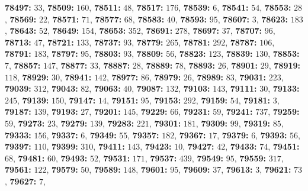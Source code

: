 \textsf{\bfseries 78497:} $33$, \textsf{\bfseries 78509:} $160$, \textsf{\bfseries 78511:} $48$, \textsf{\bfseries 78517:} $176$, \textsf{\bfseries 78539:} $6$, \textsf{\bfseries 78541:} $54$, \textsf{\bfseries 78553:} $28$, \textsf{\bfseries 78569:} $22$, \textsf{\bfseries 78571:} $71$, \textsf{\bfseries 78577:} $68$, \textsf{\bfseries 78583:} $40$, \textsf{\bfseries 78593:} $95$, \textsf{\bfseries 78607:} $3$, \textsf{\bfseries 78623:} $183$, \textsf{\bfseries 78643:} $52$, \textsf{\bfseries 78649:} $154$, \textsf{\bfseries 78653:} $352$, \textsf{\bfseries 78691:} $278$, \textsf{\bfseries 78697:} $37$, \textsf{\bfseries 78707:} $96$, \textsf{\bfseries 78713:} $47$, \textsf{\bfseries 78721:} $133$, \textsf{\bfseries 78737:} $93$, \textsf{\bfseries 78779:} $265$, \textsf{\bfseries 78781:} $292$, \textsf{\bfseries 78787:} $106$, \textsf{\bfseries 78791:} $183$, \textsf{\bfseries 78797:} $95$, \textsf{\bfseries 78803:} $93$, \textsf{\bfseries 78809:} $56$, \textsf{\bfseries 78823:} $123$, \textsf{\bfseries 78839:} $130$, \textsf{\bfseries 78853:} $7$, \textsf{\bfseries 78857:} $147$, \textsf{\bfseries 78877:} $33$, \textsf{\bfseries 78887:} $28$, \textsf{\bfseries 78889:} $78$, \textsf{\bfseries 78893:} $26$, \textsf{\bfseries 78901:} $29$, \textsf{\bfseries 78919:} $118$, \textsf{\bfseries 78929:} $30$, \textsf{\bfseries 78941:} $142$, \textsf{\bfseries 78977:} $86$, \textsf{\bfseries 78979:} $26$, \textsf{\bfseries 78989:} $83$, \textsf{\bfseries 79031:} $223$, \textsf{\bfseries 79039:} $312$, \textsf{\bfseries 79043:} $82$, \textsf{\bfseries 79063:} $40$, \textsf{\bfseries 79087:} $132$, \textsf{\bfseries 79103:} $143$, \textsf{\bfseries 79111:} $30$, \textsf{\bfseries 79133:} $245$, \textsf{\bfseries 79139:} $150$, \textsf{\bfseries 79147:} $14$, \textsf{\bfseries 79151:} $95$, \textsf{\bfseries 79153:} $292$, \textsf{\bfseries 79159:} $54$, \textsf{\bfseries 79181:} $3$, \textsf{\bfseries 79187:} $139$, \textsf{\bfseries 79193:} $27$, \textsf{\bfseries 79201:} $145$, \textsf{\bfseries 79229:} $66$, \textsf{\bfseries 79231:} $59$, \textsf{\bfseries 79241:} $737$, \textsf{\bfseries 79259:} $59$, \textsf{\bfseries 79273:} $23$, \textsf{\bfseries 79279:} $139$, \textsf{\bfseries 79283:} $221$, \textsf{\bfseries 79301:} $181$, \textsf{\bfseries 79309:} $99$, \textsf{\bfseries 79319:} $85$, \textsf{\bfseries 79333:} $156$, \textsf{\bfseries 79337:} $6$, \textsf{\bfseries 79349:} $55$, \textsf{\bfseries 79357:} $182$, \textsf{\bfseries 79367:} $17$, \textsf{\bfseries 79379:} $6$, \textsf{\bfseries 79393:} $56$, \textsf{\bfseries 79397:} $110$, \textsf{\bfseries 79399:} $310$, \textsf{\bfseries 79411:} $143$, \textsf{\bfseries 79423:} $10$, \textsf{\bfseries 79427:} $42$, \textsf{\bfseries 79433:} $74$, \textsf{\bfseries 79451:} $68$, \textsf{\bfseries 79481:} $60$, \textsf{\bfseries 79493:} $52$, \textsf{\bfseries 79531:} $171$, \textsf{\bfseries 79537:} $439$, \textsf{\bfseries 79549:} $95$, \textsf{\bfseries 79559:} $317$, \textsf{\bfseries 79561:} $122$, \textsf{\bfseries 79579:} $50$, \textsf{\bfseries 79589:} $148$, \textsf{\bfseries 79601:} $95$, \textsf{\bfseries 79609:} $37$, \textsf{\bfseries 79613:} $3$, \textsf{\bfseries 79621:} $73$, \textsf{\bfseries 79627:} $7$, 
